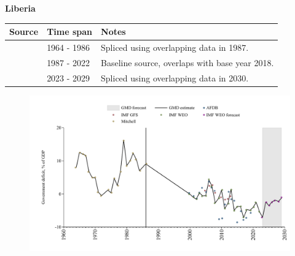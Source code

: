 \documentclass[12pt,a4paper,landscape]{article}
\begin{document}
\begin{adjustbox}{max totalsize={\paperwidth}{\paperheight},center}
\begin{minipage}[t][\textheight][t]{\textwidth}
\vspace*{0.5cm}
{}
\begin{center}
{\Large\bfseries Liberia}
\end{center}
\vspace{0.5cm}
\begin{table}[H]
\centering
\small
\begin{tabular}{|l|l|l|}
\hline
\textbf{Source} & \textbf{Time span} & \textbf{Notes} \\
\hline
\rowcolor{white}\cite{Mitchell}& 1964 - 1986 &Spliced using overlapping data in 1987.\\
\rowcolor{lightgray}\cite{IMF_WEO}& 1987 - 2022 &Baseline source, overlaps with base year 2018.\\
\rowcolor{white}\cite{IMF_WEO_forecast}& 2023 - 2029 &Spliced using overlapping data in 2030.\\
\hline
\end{tabular}
\end{table}
\begin{figure}[H]
\centering
\includegraphics[width=\textwidth,height=0.6\textheight,keepaspectratio]{graphs/LBR_govdef_GDP.pdf}
\end{figure}
\end{minipage}
\end{adjustbox}
\end{document}
